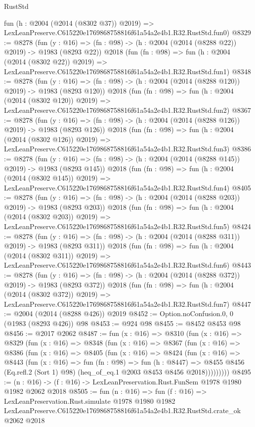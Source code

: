 \begin{lexlean}{RustStd}
\begin{coremodule}
    fun (h : @2004 (@2014 (@8302 @37)) @2019) =>
    LexLeanPreserve.C615220e1769868758816f61a54a2e4b1.R32.RustStd.fun0)
@8329 := @8278
    (fun (y : @16) => (fn : @98) -> (h : @2004 (@2014 (@8288 @22)) @2019) -> @1983 (@8293 @22))
    @2018
    (fun (fn : @98) =>
    fun (h : @2004 (@2014 (@8302 @22)) @2019) =>
    LexLeanPreserve.C615220e1769868758816f61a54a2e4b1.R32.RustStd.fun1)
@8348 := @8278
    (fun (y : @16) => (fn : @98) -> (h : @2004 (@2014 (@8288 @120)) @2019) -> @1983 (@8293 @120))
    @2018
    (fun (fn : @98) =>
    fun (h : @2004 (@2014 (@8302 @120)) @2019) =>
    LexLeanPreserve.C615220e1769868758816f61a54a2e4b1.R32.RustStd.fun2)
@8367 := @8278
    (fun (y : @16) => (fn : @98) -> (h : @2004 (@2014 (@8288 @126)) @2019) -> @1983 (@8293 @126))
    @2018
    (fun (fn : @98) =>
    fun (h : @2004 (@2014 (@8302 @126)) @2019) =>
    LexLeanPreserve.C615220e1769868758816f61a54a2e4b1.R32.RustStd.fun3)
@8386 := @8278
    (fun (y : @16) => (fn : @98) -> (h : @2004 (@2014 (@8288 @145)) @2019) -> @1983 (@8293 @145))
    @2018
    (fun (fn : @98) =>
    fun (h : @2004 (@2014 (@8302 @145)) @2019) =>
    LexLeanPreserve.C615220e1769868758816f61a54a2e4b1.R32.RustStd.fun4)
@8405 := @8278
    (fun (y : @16) => (fn : @98) -> (h : @2004 (@2014 (@8288 @203)) @2019) -> @1983 (@8293 @203))
    @2018
    (fun (fn : @98) =>
    fun (h : @2004 (@2014 (@8302 @203)) @2019) =>
    LexLeanPreserve.C615220e1769868758816f61a54a2e4b1.R32.RustStd.fun5)
@8424 := @8278
    (fun (y : @16) => (fn : @98) -> (h : @2004 (@2014 (@8288 @311)) @2019) -> @1983 (@8293 @311))
    @2018
    (fun (fn : @98) =>
    fun (h : @2004 (@2014 (@8302 @311)) @2019) =>
    LexLeanPreserve.C615220e1769868758816f61a54a2e4b1.R32.RustStd.fun6)
@8443 := @8278
    (fun (y : @16) => (fn : @98) -> (h : @2004 (@2014 (@8288 @372)) @2019) -> @1983 (@8293 @372))
    @2018
    (fun (fn : @98) =>
    fun (h : @2004 (@2014 (@8302 @372)) @2019) =>
    LexLeanPreserve.C615220e1769868758816f61a54a2e4b1.R32.RustStd.fun7)
@8447 := @2004 (@2014 (@8288 @426)) @2019
@8452 := Option.noConfusion.{0, 0} (@1983 (@8293 @426)) @98
@8453 := @924 @98
@8455 := @8452 @8453 @98
@8456 := @2017 @2062
@8487 := fun (x : @16) =>
  @8310
    (fun (x : @16) =>
    @8329
      (fun (x : @16) =>
      @8348
        (fun (x : @16) =>
        @8367
          (fun (x : @16) =>
          @8386
            (fun (x : @16) =>
            @8405
              (fun (x : @16) =>
              @8424
                (fun (x : @16) =>
                @8443
                  (fun (x : @16) =>
                  fun (fn : @98) =>
                  fun (h : @8447) =>
                  @8455
                    @8456
                    (Eq.refl.{2} (Sort 1) @98)
                    (heq_of_eq.{1} @2003 @8453 @8456 @2018)))))))))
@8495 := (n : @16) -> (f : @16) -> LexLeanPreservation.Rust.FunSem @1978 @1980 @1982 @2062 @2018
@8505 := fun (n : @16) =>
  fun (f : @16) =>
  LexLeanPreservation.Rust.simulate
    @1978
    @1980
    @1982
    LexLeanPreserve.C615220e1769868758816f61a54a2e4b1.R32.RustStd.crate_ok
    @2062
    @2018
\end{coremodule}
\end{lexlean}
